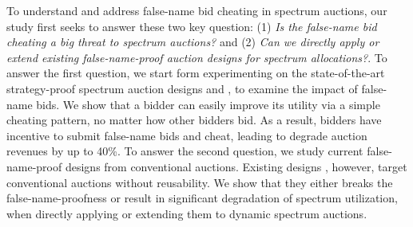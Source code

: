 \documentclass{sig-alternate}
\begin{document}
To understand and address false-name bid cheating in spectrum auctions, our study first seeks to answer these two key question: (1) \textit{Is the false-name bid cheating a big threat to spectrum auctions?} and (2) \textit{Can we directly apply or extend existing false-name-proof auction designs for spectrum allocations?}. To answer the first question, we start form experimenting on the state-of-the-art strategy-proof spectrum auction designs \cite{Mobicom08:Zhou} and \cite{Wu:11:INFOCOM}, to examine the impact of false-name bids. We show that a bidder can easily improve its utility via a simple cheating pattern, no matter how other bidders bid. As a result, bidders have incentive to submit false-name bids and cheat, leading to degrade auction revenues by up to 40\%. To answer the second question, we study current false-name-proof designs from conventional auctions. Existing designs \cite{Yokoo:AI:02,Yokoo:ijcai:01}, however, target conventional auctions without reusability. We show that they either breaks the false-name-proofness or result in significant degradation of spectrum utilization, when directly applying or extending them to dynamic spectrum auctions.


\end{document}
